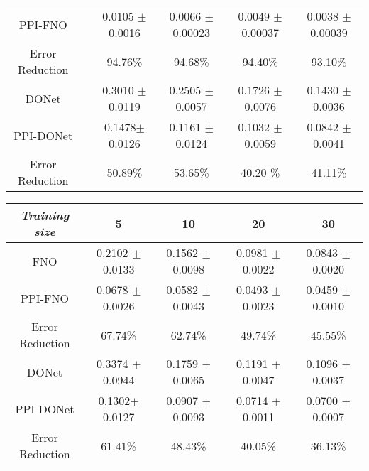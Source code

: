 \begin{table*}[htbp!]
\begin{subtable}{\textwidth}
\begin{tabular}{cccccc}
        PPI-FNO          &  & 0.0105 $\pm$ 0.0016         & 0.0066 $\pm$ 0.00023        & 0.0049 $\pm$ 0.00037 		 & 0.0038 $\pm$ 0.00039    \\
        Error Reduction          &  & 94.76\%         & 94.68\%        & 
        94.40\%		 & 93.10\%  \\
        \hline
        DONet             &  & 0.3010 $\pm$ 0.0119          & 0.2505 $\pm$ 0.0057      & 0.1726 $\pm$ 0.0076	& 0.1430 $\pm$ 0.0036    \\
        PPI-DONet             &  & 0.1478$\pm$ 0.0126          & 0.1161 $\pm$ 0.0124 	& 0.1032 $\pm$ 0.0059	& 0.0842 $\pm$ 0.0041  \\ 
        Error Reduction &  & 50.89\%         & 53.65\%    	& 40.20
        \%& 41.11\%  \\ \hline
    \end{tabular}
    \end{subtable}
    \begin{subtable}{\textwidth}
    \caption{\small \textit{Eikonal}}
    \small
    \centering
        \begin{tabular}{ccccc}
        \hline
        \textit{Training size}        & {5}             & {10}         & {20}     & {30}     \\ \hline
        FNO                    & 0.2102 $\pm$ 0.0133	& 0.1562 $\pm$ 0.0098   & 0.0981 $\pm$ 0.0022   & 0.0843 $\pm$ 0.0020        \\
        PPI-FNO            & 0.0678 $\pm$ 0.0026         & 0.0582 $\pm$ 0.0043        & 0.0493 $\pm$ 0.0023 		 & 0.0459 $\pm$ 0.0010    \\
        Error Reduction & 67.74\%         & 62.74\%        & 49.74\%		 & 45.55\%   \\
        \hline
        DONet               & 0.3374 $\pm$ 0.0944          & 0.1759 $\pm$ 0.0065      & 0.1191 $\pm$ 0.0047 	& 0.1096 $\pm$ 0.0037    \\
        PPI-DONet               & 0.1302$\pm$ 0.0127          & 0.0907 $\pm$ 0.0093 	& 0.0714 $\pm$ 0.0011	& 0.0700 $\pm$ 0.0007  \\ 
        Error Reduction   & 61.41\%         & 48.43\%    	& 40.05\%	& 36.13\%  \\ \hline

\end{tabular}
\end{subtable}
\end{table*}
